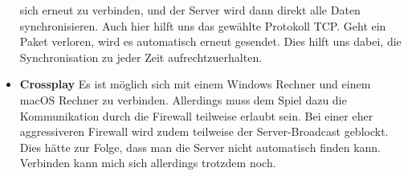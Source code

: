\begin{itemize}
        sich erneut zu verbinden, und der Server wird dann direkt alle Daten synchronisieren. Auch hier hilft uns das gewählte Protokoll TCP. Geht ein Paket verloren, wird es automatisch
        erneut gesendet. Dies hilft uns dabei, die Synchronisation zu jeder Zeit aufrechtzuerhalten.
    \item \textbf{Crossplay}
        Es ist möglich sich mit einem Windows Rechner und einem macOS Rechner zu verbinden. Allerdings muss dem Spiel dazu die Kommunikation durch die Firewall teilweise erlaubt sein.
        Bei einer eher aggressiveren Firewall wird zudem teilweise der Server-Broadcast geblockt. Dies hätte zur Folge, dass man die Server nicht automatisch finden kann. 
        Verbinden kann mich sich allerdings trotzdem noch.   
\end{itemize}

